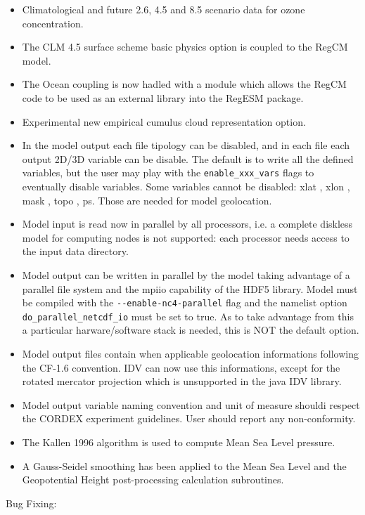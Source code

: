 \begin{itemize}
  \item Climatological and future 2.6, 4.5 and 8.5 scenario data for ozone
   concentration.
  \item The CLM 4.5 surface scheme basic physics option is coupled to the
    RegCM model.
  \item The Ocean coupling is now hadled with a module which allows the RegCM
    code to be used as an external library into the RegESM package.
  \item Experimental new empirical cumulus cloud representation option.
  \item In the model output each file tipology can be disabled, and in each file
   each output 2D/3D variable can be disable. The default is to write all the
   defined variables, but the user may play with the \verb=enable_xxx_vars=
   flags to eventually disable variables.
   Some variables cannot be disabled: xlat , xlon , mask , topo , ps.
   Those are needed for model geolocation.
  \item Model input is read now in parallel by all processors, i.e. a complete
   diskless model for computing nodes is not supported: each processor needs
   access to the input data directory.
  \item Model output can be written in parallel by the model taking advantage
    of a parallel file system and the mpiio capability of the HDF5 library.
    Model must be compiled with the \verb=--enable-nc4-parallel= flag and the
    namelist option \verb=do_parallel_netcdf_io= must be set to true.
    As to take advantage from this a particular harware/software stack is
    needed, this is NOT the default option.
  \item Model output files contain when applicable geolocation informations
   following the CF-1.6 convention. IDV can now use this informations, except
   for the rotated mercator projection which is unsupported in the java IDV
   library.
  \item Model output variable naming convention and unit of measure shouldi
    respect the CORDEX experiment guidelines. User should report any
    non-conformity.
  \item The Kallen 1996 algorithm is used to compute Mean Sea Level pressure.
  \item A Gauss-Seidel smoothing has been applied to the Mean Sea Level and the
   Geopotential Height post-processing calculation subroutines.
\end{itemize}
Bug Fixing:

